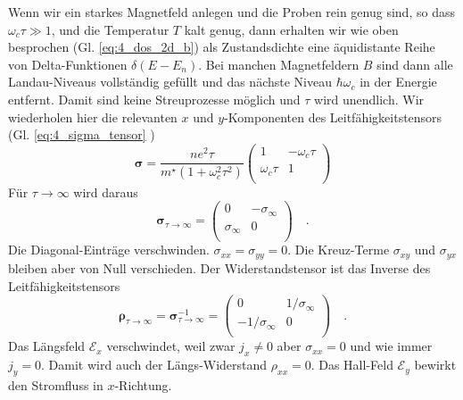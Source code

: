 Wenn wir ein starkes Magnetfeld anlegen und die Proben rein genug sind, so dass $\omega_c \tau \gg 1$, und die Temperatur $T$ kalt genug, dann erhalten wir wie oben besprochen (Gl. \ref{eq:4_dos_2d_b}) als Zustandsdichte eine äquidistante Reihe von Delta-Funktionen $\delta(E-E_n)$.  Bei manchen Magnetfeldern $B$ sind dann alle Landau-Niveaus vollständig gefüllt und das nächste Niveau $\hbar \omega_c$ in der Energie 
  entfernt. Damit sind keine Streuprozesse möglich und $\tau$ wird unendlich. Wir wiederholen hier die relevanten $x$ und $y$-Komponenten des Leitfähigkeitstensors (Gl. \ref{eq:4_sigma_tensor} )
  \begin{equation}
   \bm{\sigma} = \frac{ n e^2 \tau}{ m^\star( 1+ \omega_c^2 \tau^2)}
   \begin{pmatrix}
      1  & - \omega_c \tau \\
      \omega_c \tau & 1   \\
   \end{pmatrix} 
\end{equation}
 Für  $\tau \rightarrow \infty$ wird daraus
\begin{equation}
   \bm{\sigma}_{\tau \rightarrow \infty} =
   \begin{pmatrix}
      0  & -\sigma_\infty  \\
     \sigma_\infty  & 0   \\
   \end{pmatrix} \quad .
\end{equation} 
Die Diagonal-Einträge verschwinden. $\sigma_{xx} = \sigma_{yy} = 0$.  Die Kreuz-Terme $\sigma_{xy}$ und $\sigma_{yx}$ bleiben aber von Null  verschieden. Der Widerstandstensor ist das Inverse des Leitfähigkeitstensors
  \begin{equation}
   \bm{\rho}_{\tau \rightarrow \infty} = 
   \bm{\sigma}_{\tau \rightarrow \infty}^{-1} =
   \begin{pmatrix}
      0  & 1/\sigma_\infty  \\
     -1/\sigma_\infty  & 0   \\
   \end{pmatrix} \quad .
\end{equation}
Das Längsfeld $\mathcal{E}_x$ verschwindet, weil zwar $j_x \neq 0$ aber  $\sigma_{xx} = 0$ und wie immer  $j_y = 0$. Damit wird auch der Längs-Widerstand $\rho_{xx} = 0$. Das Hall-Feld $\mathcal{E}_y$ bewirkt den Stromfluss in $x$-Richtung.

